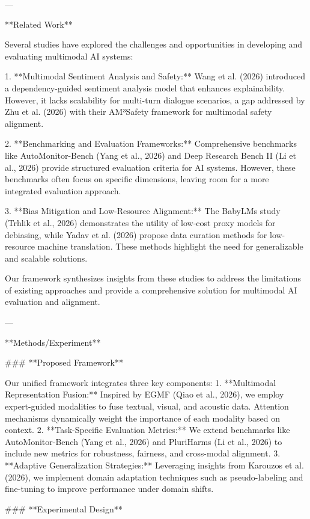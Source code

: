 ---

**Related Work**

Several studies have explored the challenges and opportunities in developing and evaluating multimodal AI systems:

1. **Multimodal Sentiment Analysis and Safety:** Wang et al. (2026) introduced a dependency-guided sentiment analysis model that enhances explainability. However, it lacks scalability for multi-turn dialogue scenarios, a gap addressed by Zhu et al. (2026) with their AM³Safety framework for multimodal safety alignment.

2. **Benchmarking and Evaluation Frameworks:** Comprehensive benchmarks like AutoMonitor-Bench (Yang et al., 2026) and Deep Research Bench II (Li et al., 2026) provide structured evaluation criteria for AI systems. However, these benchmarks often focus on specific dimensions, leaving room for a more integrated evaluation approach.

3. **Bias Mitigation and Low-Resource Alignment:** The BabyLMs study (Trhlik et al., 2026) demonstrates the utility of low-cost proxy models for debiasing, while Yadav et al. (2026) propose data curation methods for low-resource machine translation. These methods highlight the need for generalizable and scalable solutions.

Our framework synthesizes insights from these studies to address the limitations of existing approaches and provide a comprehensive solution for multimodal AI evaluation and alignment.

---

**Methods/Experiment**

### **Proposed Framework**

Our unified framework integrates three key components:
1. **Multimodal Representation Fusion:** Inspired by EGMF (Qiao et al., 2026), we employ expert-guided modalities to fuse textual, visual, and acoustic data. Attention mechanisms dynamically weight the importance of each modality based on context.
2. **Task-Specific Evaluation Metrics:** We extend benchmarks like AutoMonitor-Bench (Yang et al., 2026) and PluriHarms (Li et al., 2026) to include new metrics for robustness, fairness, and cross-modal alignment.
3. **Adaptive Generalization Strategies:** Leveraging insights from Karouzos et al. (2026), we implement domain adaptation techniques such as pseudo-labeling and fine-tuning to improve performance under domain shifts.

### **Experimental Design**

